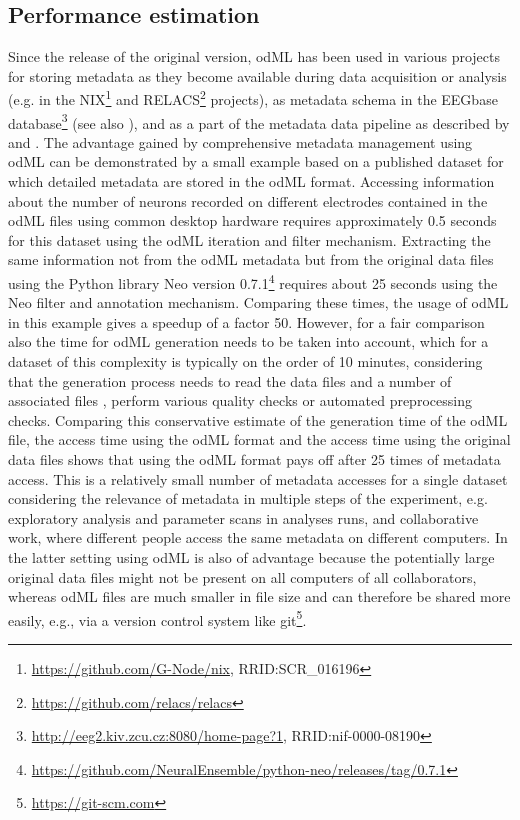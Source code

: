 {\subsection{Performance estimation}
Since the release of the original version, odML has been used in various projects for storing metadata as they become available during data acquisition or analysis (e.g. in the NIX\footnote{\url{https://github.com/G-Node/nix}, RRID:SCR\_016196} and RELACS\footnote{\url{https://github.com/relacs/relacs}} projects), as metadata schema in the EEGbase database\footnote{\url{http://eeg2.kiv.zcu.cz:8080/home-page?1}, RRID:nif-0000-08190} (see also \citealp{Moucek_2014}), and as a part of the metadata data pipeline as described by \cite{Zehl_2016} and \cite{Brochier_2018}. The advantage gained by comprehensive metadata management using odML can be demonstrated by a small example based on a published dataset \citep{Brochier_2018} for which detailed metadata are stored in the odML format. Accessing information about the number of neurons recorded on different electrodes contained in the odML files using common desktop hardware requires approximately 0.5 seconds for this dataset using the odML iteration and filter mechanism. Extracting the same information not from the odML metadata but from the original data files using the Python library Neo version 0.7.1\footnote{\url{https://github.com/NeuralEnsemble/python-neo/releases/tag/0.7.1}} requires about 25 seconds using the Neo filter and annotation mechanism. Comparing these times, the usage of odML in this example gives a speedup of a factor 50. However, for a fair comparison also the time for odML generation needs to be taken into account, which for a dataset of this complexity is typically on the order of 10 minutes, considering that the generation process needs to read the data files and a number of associated files \citep{Zehl_2016}, perform various quality checks or automated preprocessing checks. Comparing this conservative estimate of the generation time of the odML file, the access time using the odML format and the access time using the original data files shows that using the odML format pays off after 25 times of metadata access. This is a relatively small number of metadata accesses for a single dataset considering the relevance of metadata in multiple steps of the experiment, e.g. exploratory analysis and parameter scans in analyses runs, and collaborative work, where different people access the same metadata on different computers. In the latter setting using odML is also of advantage because the potentially large original data files might not be present on all computers of all collaborators, whereas odML files are much smaller in file size and can therefore be shared more easily, e.g., via a version control system like git\footnote{\url{https://git-scm.com}}.

}
